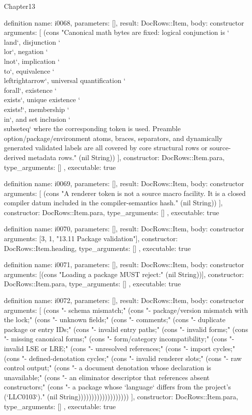 \begin{lexlean}{Chapter13}
\begin{semanticmodule}
definition{
  name: i0068,
  parameters: [],
  result: DocRows::Item,
  body: constructor{
    arguments: [
      (cons "Canonical math bytes are fixed: logical conjunction is `\\land`, disjunction `\\lor`, negation `\\lnot`, implication `\\to`, equivalence `\\leftrightarrow`, universal quantification `\\forall`, existence `\\exists`, unique existence `\\exists!`, membership `\\in`, and set inclusion `\\subseteq` where the corresponding token is used. Preamble option/package/environment atoms, braces, separators, and dynamically generated validated labels are all covered by core structural rows or source-derived metadata rows." (nil String))
    ],
    constructor: DocRows::Item.para,
    type_arguments: []
  },
  executable: true
}

definition{
  name: i0069,
  parameters: [],
  result: DocRows::Item,
  body: constructor{
    arguments: [
      (cons "A renderer token is not a source macro facility. It is a closed compiler datum included in the compiler-semantics hash." (nil String))
    ],
    constructor: DocRows::Item.para,
    type_arguments: []
  },
  executable: true
}

definition{
  name: i0070,
  parameters: [],
  result: DocRows::Item,
  body: constructor{
    arguments: [3, 1, "13.11 Package validation"],
    constructor: DocRows::Item.heading,
    type_arguments: []
  },
  executable: true
}

definition{
  name: i0071,
  parameters: [],
  result: DocRows::Item,
  body: constructor{
    arguments: [(cons "Loading a package MUST reject:" (nil String))],
    constructor: DocRows::Item.para,
    type_arguments: []
  },
  executable: true
}

definition{
  name: i0072,
  parameters: [],
  result: DocRows::Item,
  body: constructor{
    arguments: [
      (cons "- schema mismatch;" (cons "- package/version mismatch with the lock;" (cons "- unknown fields;" (cons "- comments;" (cons "- duplicate package or entry IDs;" (cons "- invalid entry paths;" (cons "- invalid forms;" (cons "- missing canonical forms;" (cons "- form/category incompatibility;" (cons "- invalid LSE or LRE;" (cons "- unresolved references;" (cons "- import cycles;" (cons "- defined-denotation cycles;" (cons "- invalid renderer slots;" (cons "- raw control output;" (cons "- a document denotation whose declaration is unavailable;" (cons "- an eliminator descriptor that references absent constructors;" (cons "- a package whose `language` differs from the project's (`LLC0103`)." (nil String)))))))))))))))))))
    ],
    constructor: DocRows::Item.para,
    type_arguments: []
  },
  executable: true
}


\end{semanticmodule}
\end{lexlean}
